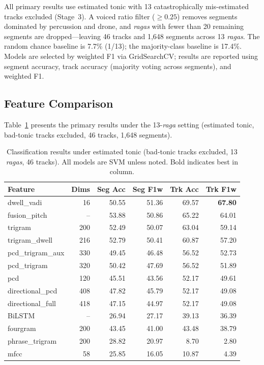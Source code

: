 \documentclass[11pt,a4paper]{article}
\begin{document}
{All primary results use estimated tonic with 13 catastrophically mis-estimated tracks excluded (Stage~3). A voiced ratio filter ($\geq 0.25$) removes segments dominated by percussion and drone, and \textit{ragas} with fewer than 20 remaining segments are dropped---leaving 46 tracks and 1,648 segments across 13 \textit{ragas}. The random chance baseline is 7.7\% (1/13); the majority-class baseline is 17.4\%. Models are selected by weighted F1 via GridSearchCV; results are reported using segment accuracy, track accuracy (majority voting across segments), and weighted F1.

\subsection{Feature Comparison}
\label{sec:feature-comparison}

Table~\ref{tab:results} presents the primary results under the 13-\textit{raga} setting (estimated tonic, bad-tonic tracks excluded, 46 tracks, 1,648 segments).

\begin{table}[ht]
\centering
\caption{Classification results under estimated tonic (bad-tonic tracks excluded, 13 \textit{ragas}, 46 tracks). All models are SVM unless noted. Bold indicates best in column.}
\label{tab:results}
\small
\begin{tabular}{@{}lrrrrr@{}}
\toprule
\textbf{Feature} & \textbf{Dims} & \textbf{Seg Acc} & \textbf{Seg F1w} & \textbf{Trk Acc} & \textbf{Trk F1w} \\
\midrule
dwell\_vadi & 16 & 50.55 & 51.36 & 69.57 & \textbf{67.80} \\
fusion\_pitch & -- & 53.88 & 50.86 & 65.22 & 64.01 \\
trigram & 200 & 52.49 & 50.07 & 63.04 & 59.14 \\
trigram\_dwell & 216 & 52.79 & 50.41 & 60.87 & 57.20 \\
pcd\_trigram\_aux & 330 & 49.45 & 46.48 & 56.52 & 52.73 \\
pcd\_trigram & 320 & 50.42 & 47.69 & 56.52 & 51.89 \\
pcd & 120 & 45.51 & 43.56 & 52.17 & 49.61 \\
directional\_pcd & 408 & 47.82 & 45.79 & 52.17 & 49.08 \\
directional\_full & 418 & 47.15 & 44.97 & 52.17 & 49.08 \\
BiLSTM & -- & 26.94 & 27.17 & 39.13 & 36.39 \\
fourgram & 200 & 43.45 & 41.00 & 43.48 & 38.79 \\
phrase\_trigram & 200 & 28.82 & 20.97 & 8.70 & 2.80 \\
mfcc & 58 & 25.85 & 16.05 & 10.87 & 4.39 \\
\bottomrule
\end{tabular}


\end{table}}
\end{document}
